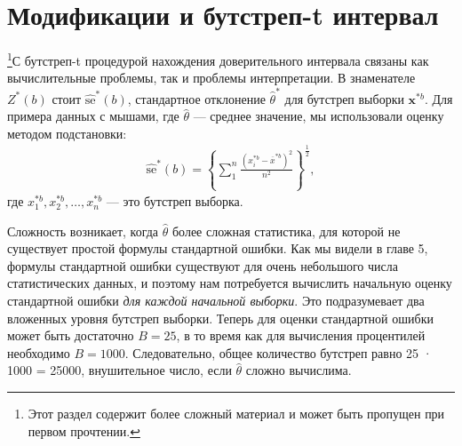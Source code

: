 \section{Модификации и бутстреп-t интервал}

\footnote{Этот раздел содержит более сложный материал и может быть пропущен при первом прочтении.}С бутстреп-t процедурой нахождения доверительного интервала связаны как вычислительные проблемы, так и проблемы интерпретации. В знаменателе $Z^{*}(b)$ стоит $\widehat{\text{se}}^{*}(b)$, стандартное отклонение $\widehat{\theta}^{*}$ для бутстреп выборки $\textbf{x}^{*b}$. Для примера данных с мышами, где  $\widehat{\theta}$ --- среднее значение, мы использовали оценку методом подстановки:
\begin{gather}\label{12.23}
\widehat{\text{se}}^{*}(b) = \left\{\sum_{1}^{n} \frac{(x_{i}^{*b} -  \overline{x}^{*b})^{2}}{n^{2}}\right\}^{\frac{1}{2}},
\end{gather}
где $x_{1}^{*b}, x_{2}^{*b},\ldots,x_{n}^{*b}$ --- это бутстреп выборка.

Сложность возникает, когда $\widehat{\theta}$ более сложная статистика, для которой не существует простой формулы стандартной ошибки. Как мы видели в главе 5, формулы стандартной ошибки существуют для очень небольшого числа статистических данных, и поэтому нам потребуется вычислить начальную оценку стандартной ошибки \textit{для каждой начальной выборки}. Это подразумевает два вложенных уровня бутстреп выборки. Теперь для оценки стандартной ошибки может быть достаточно $B = 25$, в то время как для вычисления процентилей необходимо $B = 1000$. Следовательно, общее количество бутстреп равно 25 · 1000 = 25000, внушительное число, если $\widehat{\theta}$ сложно вычислима.

